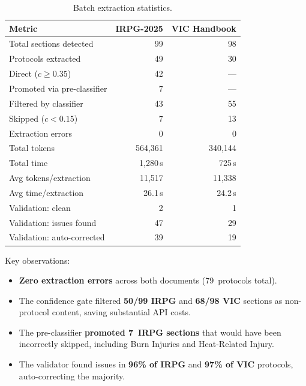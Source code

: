 \documentclass[12pt,a4paper]{article}
\begin{document}
\begin{table}[H]
\centering
\caption{Batch extraction statistics.}
\label{tab:batch-stats}
\begin{tabular}{l r r}
\toprule
\textbf{Metric} & \textbf{IRPG-2025} & \textbf{VIC Handbook} \\
\midrule
Total sections detected           & 99  & 98 \\
Protocols extracted               & 49  & 30 \\
\quad Direct ($c \geq 0.35$)      & 42  & --- \\
\quad Promoted via pre-classifier  & 7   & --- \\
Filtered by classifier            & 43  & 55 \\
Skipped ($c < 0.15$)             & 7   & 13 \\
Extraction errors                 & 0   & 0 \\
\midrule
Total tokens                      & 564,361   & 340,144 \\
Total time                        & 1,280\,s  & 725\,s \\
Avg tokens/extraction             & 11,517    & 11,338 \\
Avg time/extraction               & 26.1\,s   & 24.2\,s \\
\midrule
Validation: clean                 & 2  & 1 \\
Validation: issues found          & 47 & 29 \\
Validation: auto-corrected        & 39 & 19 \\
\bottomrule
\end{tabular}
\end{table}

Key observations:
\begin{itemize}[leftmargin=2em]
    \item \textbf{Zero extraction errors} across both documents (79~protocols total).
    \item The confidence gate filtered \textbf{50/99 IRPG} and \textbf{68/98 VIC} sections as non-protocol content, saving substantial API costs.
    \item The pre-classifier \textbf{promoted 7~IRPG sections} that would have been incorrectly skipped, including Burn Injuries and Heat-Related Injury.
    \item The validator found issues in \textbf{96\% of IRPG} and \textbf{97\% of VIC} protocols, auto-correcting the majority.
\end{itemize}
\end{document}
